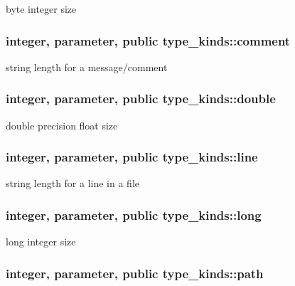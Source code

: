 byte integer size 

\hypertarget{classtype__kinds_abb1584a815b1c1b79301d6f922366eec}{
\subsubsection[{comment}]{\setlength{\rightskip}{0pt plus 5cm}integer, parameter, public type\+\_\+kinds\+::comment}}\label{classtype__kinds_abb1584a815b1c1b79301d6f922366eec}


string length for a message/comment 

\hypertarget{classtype__kinds_a34b12277eb02d1bbaaaae83e033d9890}{
\subsubsection[{double}]{\setlength{\rightskip}{0pt plus 5cm}integer, parameter, public type\+\_\+kinds\+::double}}\label{classtype__kinds_a34b12277eb02d1bbaaaae83e033d9890}


double precision float size 

\hypertarget{classtype__kinds_af0560ef37c612847670ffbfba8a9bc33}{
\subsubsection[{line}]{\setlength{\rightskip}{0pt plus 5cm}integer, parameter, public type\+\_\+kinds\+::line}}\label{classtype__kinds_af0560ef37c612847670ffbfba8a9bc33}


string length for a line in a file 

\hypertarget{classtype__kinds_a14af3c9d56db49c61252b056506a584a}{
\subsubsection[{long}]{\setlength{\rightskip}{0pt plus 5cm}integer, parameter, public type\+\_\+kinds\+::long}}\label{classtype__kinds_a14af3c9d56db49c61252b056506a584a}


long integer size 

\hypertarget{classtype__kinds_a05ab6f6ff4279480c4fd6d8b04a3efbf}{
\subsubsection[{path}]{\setlength{\rightskip}{0pt plus 5cm}integer, parameter, public type\+\_\+kinds\+::path}}\label{classtype__kinds_a05ab6f6ff4279480c4fd6d8b04a3efbf}


